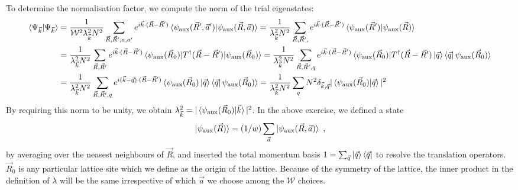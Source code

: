 \documentclass[prb]{revtex4-2}
\begin{document}
To determine the normalisation factor, we compute the norm of the trial eigenstates:
\begin{equation}\begin{aligned}
	\braket{\Psi_{\vec k} | \Psi_{\vec k}} &= \frac{1}{\mathcal{W}^2 \lambda_{\vec k}^2 N^2}\sum_{\vec R, \vec R^\prime, a, a^\prime}e^{i \vec{k}\cdot(\vec R - \vec R^\prime)}\braket{\psi_\text{aux}(\vec R^\prime, \vec a^\prime) | \psi_\text{aux}(\vec R, \vec a)} = \frac{1}{\lambda_{\vec k}^2 N^2}\sum_{\vec R, \vec R^\prime, }e^{i \vec{k}\cdot(\vec R - \vec R^\prime)}\braket{\psi_\text{aux}(\vec R^\prime) | \psi_\text{aux}(\vec R)}\\
					       &=\frac{1}{\lambda_{\vec k}^2 N^2}\sum_{\vec R, \vec R^\prime}e^{i \vec{k}\cdot(\vec R - \vec R^\prime)}\braket{\psi_\text{aux}(\vec R_0) | T^\dagger(\vec R - \vec R^\prime) | \psi_\text{aux}(\vec R_0)} = \frac{1}{\lambda_{\vec k}^2 N^2}\sum_{\vec R, \vec R^\prime, q}e^{i \vec{k}\cdot(\vec R - \vec R^\prime)}\braket{\psi_\text{aux}(\vec R_0) | T^\dagger(\vec R - \vec R^\prime) \ket{\vec q}\bra{\vec q} \psi_\text{aux}(\vec R_0)}\\
					       &= \frac{1}{\lambda_{\vec k}^2 N^2}\sum_{\vec R, \vec R^\prime, q}e^{i (\vec{k} - \vec q)\cdot(\vec R - \vec R^\prime)}\braket{\psi_\text{aux}(\vec R_0) \ket{\vec q}\bra{\vec q} \psi_\text{aux}(\vec R_0)} = \frac{1}{\lambda_{\vec k}^2 N^2}\sum_{q} N^2 \delta_{\vec{k},\vec q}|\braket{\psi_\text{aux}(\vec R_0) | \vec q}|^2\\
\end{aligned}\end{equation}
By requiring this norm to be unity, we obtain \(\lambda_{\vec k}^2 = |\braket{\psi_\text{aux}(\vec R_0) | \vec k}|^2\). In the above exercise, we defined a state 
\begin{equation}\begin{aligned}\label{zeroth_site_average}
	\ket{\psi_\text{aux}(\vec R)} = (1/w)\sum_{\vec a}\ket{\psi_\text{aux}(\vec R, \vec a)}~,
\end{aligned}\end{equation}
by averaging over the neasest neighbours of \(\vec R\), and inserted the total momentum basis \(1 = \sum_{\vec q}\ket{\vec q}\bra{\vec q}\) to resolve the translation operators. \(\vec R_0\) is any particular lattice site which we define as the origin of the lattice. Because of the symmetry of the lattice, the inner product in the definition of \(\lambda\) will be the same irrespective of which \(\vec a\) we choose among the \(\mathcal{W}\) choices.
\end{document}
